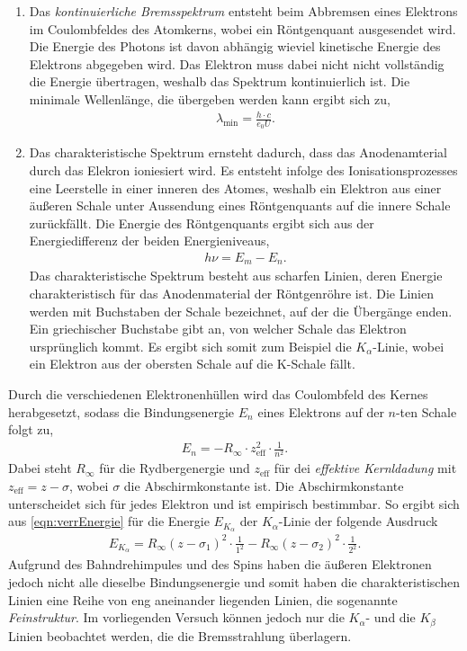 \begin{enumerate}
    \item Das \textit{kontinuierliche Bremsspektrum} entsteht beim Abbremsen eines Elektrons im Coulombfeldes des Atomkerns, wobei ein Röntgenquant ausgesendet wird. Die Energie des Photons
    ist davon abhängig wieviel kinetische Energie des Elektrons abgegeben wird. Das Elektron muss dabei nicht nicht vollständig die Energie übertragen, weshalb das Spektrum kontinuierlich ist.
    Die minimale Wellenlänge, die übergeben werden kann ergibt sich zu,
    \begin{align}
        \label{eqn:wellenlaenge}
        \lambda_{\text{min}} = \frac{h\cdot c}{e_0 U}.
    \end{align}
    \item Das charakteristische Spektrum ernsteht dadurch, dass das Anodenamterial durch das Elekron ioniesiert wird. Es entsteht infolge des Ionisationsprozesses eine Leerstelle in einer inneren
    des Atomes, weshalb ein Elektron aus einer äußeren Schale unter Aussendung eines Röntgenquants auf die innere Schale zurückfällt. Die Energie des Röntgenquants ergibt sich aus der Energiedifferenz
    der beiden Energieniveaus,
    \begin{align}
        \label{eqn:energiedifferenz}
        h \nu = E_m - E_n.
    \end{align}
    Das charakteristische Spektrum besteht aus scharfen Linien, deren Energie charakteristisch für das Anodenmaterial der Röntgenröhre ist. Die Linien werden mit Buchstaben der Schale bezeichnet, auf der die Übergänge
    enden. Ein griechischer Buchstabe gibt an, von welcher Schale das Elektron ursprünglich kommt. Es ergibt sich somit zum Beispiel die $K_\alpha$-Linie, wobei ein Elektron aus der obersten Schale auf die K-Schale fällt.
\end{enumerate}
Durch die verschiedenen Elektronenhüllen wird das Coulombfeld des Kernes herabgesetzt, sodass die Bindungsenergie $E_n$ eines Elektrons auf der $n$-ten Schale folgt zu,
\begin{align}
    \label{eqn:verrEnergie}
    E_n = -R_\infty\cdot z_{\text{eff}}^2\cdot \frac{1}{n^2}.
\end{align}
Dabei steht $R_\infty$ für die Rydbergenergie und $z_{\text{eff}}$ für dei \textit{effektive Kernldadung} mit $z_{\text{eff}} = z - \sigma$, wobei $\sigma$ die Abschirmkonstante ist.
Die Abschirmkonstante unterscheidet sich für jedes Elektron und ist empirisch bestimmbar. So ergibt sich aus \eqref{eqn:verrEnergie} für die Energie $E_{K_\alpha}$ der $K_\alpha$-Linie 
der folgende Ausdruck
\begin{align}
    E_{K_\alpha} = R_\infty (z-\sigma_1)^2\cdot \frac{1}{1^2} - R_\infty (z-\sigma_2)^2 \cdot \frac{1}{2^2}.
\end{align}
Aufgrund des Bahndrehimpules und des Spins haben die äußeren Elektronen jedoch nicht alle dieselbe Bindungsenergie und somit haben die charakteristischen Linien eine Reihe von eng
aneinander liegenden Linien, die sogenannte \textit{Feinstruktur}. Im vorliegenden Versuch können jedoch nur die $K_\alpha$- und die $K_\beta$ Linien beobachtet werden, die die Bremsstrahlung überlagern. \newline

